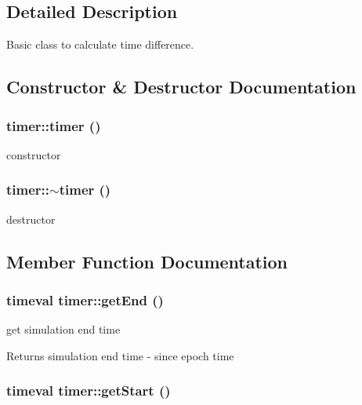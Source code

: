 \subsection{Detailed Description}
Basic class to calculate time difference. 

\subsection{Constructor \& Destructor Documentation}
\hypertarget{classtimer_ae536faf93e02933cd025a6fbcbb48d0a}{
\subsubsection[{timer}]{\setlength{\rightskip}{0pt plus 5cm}timer::timer ()}}
\label{classtimer_ae536faf93e02933cd025a6fbcbb48d0a}


constructor 

\hypertarget{classtimer_aee05958ea6b0fbf36ea1fd22747cd546}{
\subsubsection[{$\sim$timer}]{\setlength{\rightskip}{0pt plus 5cm}timer::$\sim$timer ()}}
\label{classtimer_aee05958ea6b0fbf36ea1fd22747cd546}


destructor 



\subsection{Member Function Documentation}
\hypertarget{classtimer_aa415a63f52ee3efb36bbeb9d18a813b8}{
\subsubsection[{getEnd}]{\setlength{\rightskip}{0pt plus 5cm}timeval timer::getEnd ()}}
\label{classtimer_aa415a63f52ee3efb36bbeb9d18a813b8}


get simulation end time 

\begin{DoxyReturn}{Returns}
simulation end time -\/ since epoch time 
\end{DoxyReturn}
\hypertarget{classtimer_aad52287ca6d6a3a285e171a592a85847}{
\subsubsection[{getStart}]{\setlength{\rightskip}{0pt plus 5cm}timeval timer::getStart ()}}
\label{classtimer_aad52287ca6d6a3a285e171a592a85847}


